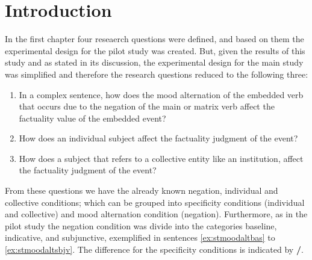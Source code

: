\label{chap:main}

\section{Introduction}
In the first chapter four reseaerch questions were defined, and based on them the experimental design for the pilot study was created. But, given the results of this study and as stated in its discussion, the experimental design for the main study was simplified and therefore the research questions reduced to the following three:\\

\begin{enumerate}[RQ1.-]
        \item In a complex sentence, how does the mood alternation of the embedded verb that occurs due to the negation of the main or matrix verb affect the factuality value of the embedded event?
        \item How does an individual subject affect the factuality judgment of the event?
        \item How does a subject that refers to a collective entity like an institution, affect the factuality judgment of the event?
\end{enumerate}

From these questions we have the already known negation, individual and collective conditions; which can be grouped into specificity conditions (individual and collective) and mood alternation condition (negation). Furthermore, as in the pilot study the negation condition was divide into the categories baseline, indicative, and subjunctive, exemplified in sentences \ref{ex:stmoodaltbas} to \ref{ex:stmoodaltsbjv}. The difference for the specificity conditions is indicated by \textbf{/}.\\

